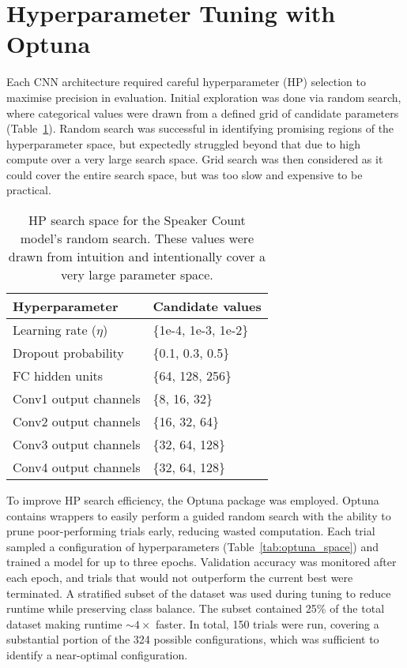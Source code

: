 \section{Hyperparameter Tuning with Optuna} 
\label{sec:Optuna}
Each CNN architecture required careful hyperparameter (HP) selection to maximise precision in evaluation. Initial exploration was done via random search, where categorical values were drawn from a defined grid of candidate parameters (Table~\ref{tab:hparam_space}). Random search was successful in identifying promising regions of the hyperparameter space, but expectedly struggled beyond that due to high compute over a very large search space. Grid search was then considered as it could cover the entire search space, but was too slow and expensive to be practical.


\begin{table}[H]
\centering
\caption{HP search space for the Speaker Count model's random search. These values were drawn from intuition and intentionally cover a very large parameter space.}
\begin{tabular}{ll}
\hline
Hyperparameter & Candidate values \\
\hline
Learning rate ($\eta$) & \{1e-4, 1e-3, 1e-2\} \\
Dropout probability & \{0.1, 0.3, 0.5\} \\
FC hidden units & \{64, 128, 256\} \\
Conv1 output channels & \{8, 16, 32\} \\
Conv2 output channels & \{16, 32, 64\} \\
Conv3 output channels & \{32, 64, 128\} \\
Conv4 output channels & \{32, 64, 128\} \\
\hline
\end{tabular}
\label{tab:hparam_space}
\end{table}

To improve HP search efficiency, the Optuna package \cite{optuna_2019} was employed. Optuna contains wrappers to easily perform a guided random search with the ability to prune poor-performing trials early, reducing wasted computation. Each trial sampled a configuration of hyperparameters (Table~\ref{tab:optuna_space}) and trained a model for up to three epochs. Validation accuracy was monitored after each epoch, and trials that would not outperform the current best were terminated. A stratified subset of the dataset was used during tuning to  reduce runtime while preserving class balance. The subset contained 25\% of the total dataset making runtime $\sim4\times$ faster. In total, 150 trials were run, covering a substantial portion of the 324 possible configurations, which was sufficient to identify a near-optimal configuration.  


